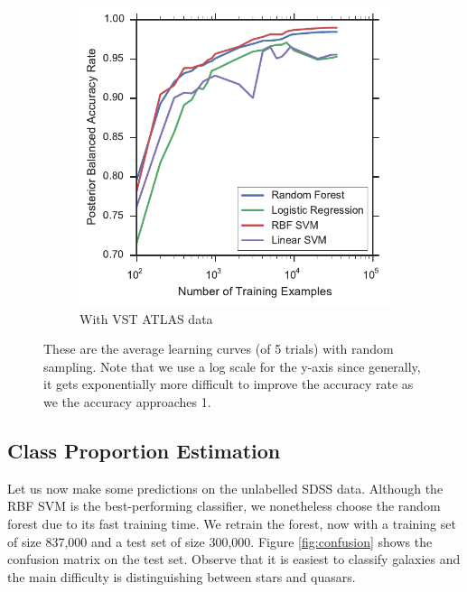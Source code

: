 \begin{figure}[tbp]
\begin{subfigure}{.5\textwidth}
		\includegraphics[width=0.99\linewidth]{figures/4_expt1/vstatlas_learning_curves}
		\caption{With VST ATLAS data}
		\label{fig:vstatlas_learning_curves}
	\end{subfigure}
	\caption[Learning curves with random sampling]{
		These are the average learning curves (of 5 trials) with random sampling.
		Note that we use a log scale for the y-axis since generally, it gets exponentially
		more difficult to improve the accuracy rate as we the accuracy approaches 1.}
	\label{fig:learning_curves}
\end{figure}



\subsection{Class Proportion Estimation}
Let us now make some predictions on the unlabelled SDSS data. Although the RBF SVM is
the best-performing classifier, we nonetheless choose the random forest due to its fast
training time. We retrain the forest, now with a training set of size 837,000 and a test
set of size 300,000. Figure \ref{fig:confusion} shows the confusion matrix on the test set.
Observe that it is easiest to classify galaxies and the main difficulty is distinguishing
between stars and quasars.

